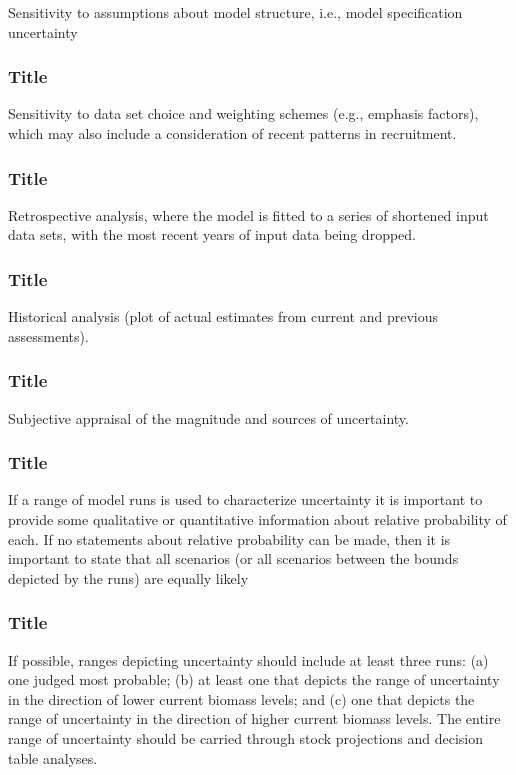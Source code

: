 \documentclass[12pt,]{article}
\begin{document}
Sensitivity to assumptions about model structure, i.e., model
specification uncertainty

\subsubsection{Title}\label{title-34}

Sensitivity to data set choice and weighting schemes (e.g., emphasis
factors), which may also include a consideration of recent patterns in
recruitment.

\subsubsection{Title}\label{title-35}

Retrospective analysis, where the model is fitted to a series of
shortened input data sets, with the most recent years of input data
being dropped.

\subsubsection{Title}\label{title-36}

Historical analysis (plot of actual estimates from current and previous
assessments).

\subsubsection{Title}\label{title-37}

Subjective appraisal of the magnitude and sources of uncertainty.

\subsubsection{Title}\label{title-38}

If a range of model runs is used to characterize uncertainty it is
important to provide some qualitative or quantitative information about
relative probability of each. If no statements about relative
probability can be made, then it is important to state that all
scenarios (or all scenarios between the bounds depicted by the runs) are
equally likely

\subsubsection{Title}\label{title-39}

\label{sec:uncertaintylast} If possible, ranges depicting uncertainty
should include at least three runs: (a) one judged most probable; (b) at
least one that depicts the range of uncertainty in the direction of
lower current biomass levels; and (c) one that depicts the range of
uncertainty in the direction of higher current biomass levels. The
entire range of uncertainty should be carried through stock projections
and decision table analyses.
\end{document}
